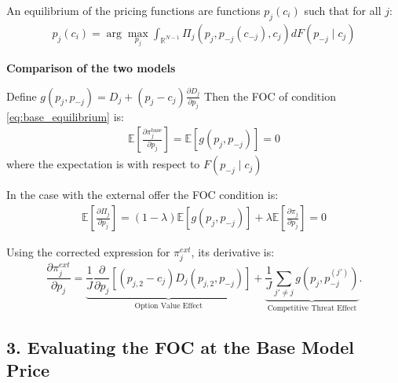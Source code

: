 \documentclass[12pt]{article}
\begin{document}
An equilibrium of the pricing functions are functions $p_j(c_i)$ such that for all $j$:
\begin{align}\label{eq:base_equilibrium3}
    p_j(c_i) = \arg \max_{p_j} \int_{\mathbb{R}^{N-1}}^{} \Pi_j(p_j, p_{-j}(c_{-j}), c_j) dF(p_{-j} \mid c_j)   
\end{align}




\vspace{2cm}

\textbf{Comparison of the two models }

Define $g(p_j, p_{-j}) =  D_j + (p_j - c_j) \frac{\partial D_j}{\partial p_j}$ 
Then the FOC of condition \ref{eq:base_equilibrium} is:
\begin{align}
\label{eq:FOC_base} 
    \mathbb{E}\left[ \frac{\partial \pi_j^{\text{base}}}{\partial p_j} \right] = \mathbb{E}\left[ g(p_j, p_{-j}) \right] = 0
\end{align}
where the expectation is with respect to $F(p_{-j} \mid c_j)$

In the case with the external offer the FOC condition is: 
\begin{align}
\label{eq:FOC_external} 
    \mathbb{E}\left[ \frac{\partial \Pi_j}{\partial p_j} \right] = (1-\lambda) \mathbb{E}\left[ g(p_j, p_{-j}) \right] + \lambda \mathbb{E}\left[ \frac{\partial \pi_j}{\partial p_j} \right] = 0   
\end{align}








\vspace{2cm}

Using the corrected expression for $\pi_j^{ext}$, its derivative is:
\[
\frac{\partial \pi_j^{ext}}{\partial p_j} = \underbrace{\frac{1}{J} \frac{\partial}{\partial p_j} \left[ (p_{j,2} - c_j) D_j(p_{j,2}, p_{-j}) \right]}_{\text{Option Value Effect}} + \underbrace{\frac{1}{J} \sum_{j' \ne j} g(p_j, p_{-j}^{(j')})}_{\text{Competitive Threat Effect}}.
\]

\subsection*{3. Evaluating the FOC at the Base Model Price}
\end{document}
